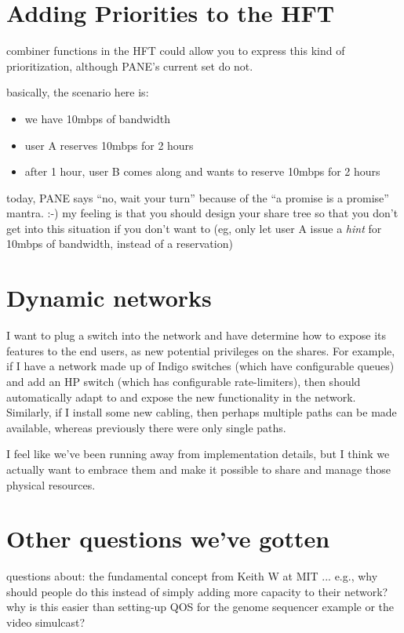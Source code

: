 \section{Adding Priorities to the HFT}

combiner functions in the HFT could allow you to express this kind of prioritization, although PANE's current set do not.

basically, the scenario here is:
\begin{itemize}
\item we have 10mbps of bandwidth
\item user A reserves 10mbps for 2 hours
\item after 1 hour, user B comes along and wants to reserve 10mbps for 2 hours
\end{itemize}

today, PANE says ``no, wait your turn'' because of the ``a promise is a promise'' mantra. :-)  my feeling is that you should design your share tree so that you don't get into this situation if you don't want to (eg, only let user A issue a \emph{hint} for 10mbps of bandwidth, instead of a reservation)

\section{Dynamic networks}

I want to plug a switch into the network and have \sys determine how to expose 
its features to the end users, as new potential privileges on the shares. For 
example, if I have a network made up of Indigo switches (which have 
configurable queues) and add an HP switch (which has configurable 
rate-limiters), then \sys should automatically adapt to and expose the new 
functionality in the network. Similarly, if I install some new cabling, then 
perhaps multiple paths can be made available, whereas previously there were 
only single paths.

I feel like we've been running away from implementation details, but I think we 
actually want to embrace them and make it possible to share and manage those 
physical resources.

\section{Other questions we've gotten}

questions about: the fundamental concept from Keith W at MIT ... e.g., why should people do this instead of simply adding more capacity to their network? why is this easier than setting-up QOS for the genome sequencer example or the video simulcast?

